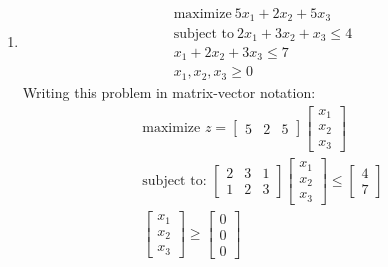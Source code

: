 \documentclass{article}
\begin{document}
\begin{enumerate}
    \item 
    \begin{gather*}
        \text{maximize} \ 5x_1 + 2x_2 + 5x_3\\
        \text{subject to} \ 2x_1 + 3x_2 + x_3 \leq 4\\
        x_1 + 2x_2 + 3x_3 \leq 7 \\
        x_1, x_2, x_3 \geq 0
    \end{gather*}
    Writing this problem in matrix-vector notation: 
    \begin{gather*}
        \text{maximize } z = 
        \begin{bmatrix}
            5 & 2 & 5
        \end{bmatrix}
        \begin{bmatrix}
            x_1 \\ x_2 \\ x_3
        \end{bmatrix}
        \\
        \text{subject to: }
        \begin{bmatrix}
            2 & 3 & 1\\
            1 & 2 & 3
        \end{bmatrix}
        \begin{bmatrix}
            x_1 \\ x_2 \\ x_3
        \end{bmatrix} 
        \leq 
        \begin{bmatrix}
            4 \\ 7
        \end{bmatrix}
        \\
        \begin{bmatrix}
            x_1\\ x_2\\ x_3 
        \end{bmatrix}
        \geq 
        \begin{bmatrix}
            0 \\ 0 \\ 0
        \end{bmatrix}
    \end{gather*}
\end{enumerate}
\end{document}
